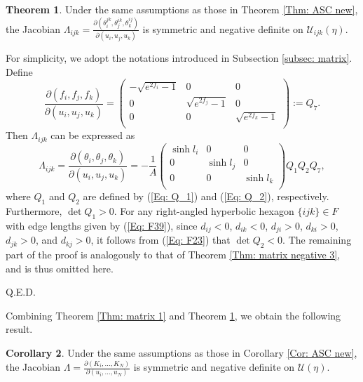 \documentclass[12pt]{amsart}
\theoremstyle{definition}
\newtheorem{theorem}{Theorem}[section]
\newtheorem{corollary}[theorem]{Corollary}
\def\qed{\hfill{Q.E.D.}\smallskip}
\begin{document}
\begin{theorem}\label{Thm: matrix 2}
Under the same assumptions as those in Theorem \ref{Thm: ASC new},
the Jacobian $\Lambda_{ijk}=\frac{\partial(\theta^{jk}_i,\theta^{ik}_j,\theta^{ij}_k)}
{\partial(u_i,u_j,u_k)}$ is symmetric and negative definite on $\mathcal{U}_{ijk}(\eta)$.
\end{theorem}
\proof
For simplicity, we adopt the notations introduced in Subsection \ref{subsec: matrix}.
Define
\begin{equation*}
\frac{\partial(f_i,f_j,f_k)}
{\partial(u_i,u_j,u_k)}
=\left(
   \begin{array}{ccc}
     -\sqrt{e^{2f_i}-1} & 0 & 0 \\
     0 & \sqrt{e^{2f_j}-1} & 0 \\
     0 & 0 & \sqrt{e^{2f_k}-1} \\
   \end{array}
 \right)
 :=Q_7.
\end{equation*}
Then $\Lambda_{ijk}$ can be expressed as
\begin{equation*}
\Lambda_{ijk}=
\frac{\partial(\theta_i,\theta_j,\theta_k)}
{\partial(u_i,u_j,u_k)}
=-\frac{1}{A}
 \left(
   \begin{array}{ccc}
     \sinh l_i & 0 & 0 \\
     0 & \sinh l_j & 0 \\
     0 & 0 & \sinh l_k \\
   \end{array}
 \right)Q_1Q_2Q_7,
\end{equation*}
where $Q_1$ and $Q_2$ are defined by (\ref{Eq: Q_1}) and (\ref{Eq: Q_2}), respectively.
Furthermore, $\det Q_1>0$.
For any right-angled hyperbolic hexagon $\{ijk\}\in F$ with edge lengths given by (\ref{Eq: F39}),
since $d_{ij}<0$, $d_{ik}<0$, $d_{ji}>0$, $d_{ki}>0$, $d_{jk}>0$, and $d_{kj}>0$, it follows from (\ref{Eq: F23}) that $\det Q_2<0$.
The remaining part of the proof is analogously to that of Theorem \ref{Thm: matrix negative 3}, and is thus omitted here.

\qed

Combining Theorem \ref{Thm: matrix 1} and Theorem \ref{Thm: matrix 2},
we obtain the following result.
\begin{corollary}
Under the same assumptions as those in Corollary \ref{Cor: ASC new},
the Jacobian $\Lambda=\frac{\partial (K_i,..., K_N)}{\partial(u_i,...,u_N)}$ is symmetric and negative definite on $\mathcal{U}(\eta)$.
\end{corollary}
\end{document}
